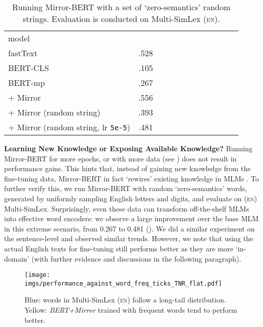 \documentclass[11pt]{article}
\newcommand{\en}{{\textsc{en}}\xspace}
\begin{document}
\begin{table}[]
\centering
\setlength{\tabcolsep}{2.0pt}
\small
\begin{tabular}{lccccccccccc}
\cmidrule[1.0pt]{1-10}
model &   \\
\cmidrule[1.0pt]{1-10}
fastText & .528 \\
\cmidrule[1.0pt]{1-10}
BERT-CLS & .105 \\
BERT-mp & .267 \\
\hdashline
+ Mirror & .556 \\
\hdashline
+ Mirror (random string) & .393 \\
+ Mirror (random string, lr \texttt{5e-5}) & .481 \\
\cmidrule[1.0pt]{1-10}
\end{tabular}
 \vspace{-1.5mm}
\caption{Running Mirror-BERT with a set of `zero-semantics' random strings. Evaluation is conducted on Multi-SimLex (\en).}
\label{tab:random_string_full}
\end{table}



\vspace{1.5mm}
\noindent \textbf{Learning New Knowledge or Exposing Available Knowledge?} Running Mirror-BERT for more epochs, or with more data (see ) does not result in performance gains. This hints that, instead of gaining new knowledge from the fine-tuning data, Mirror-BERT in fact `rewires' existing knowledge in MLMs \cite{Zaken:2020bitfit}. To further verify this, we run Mirror-BERT with random `zero-semantics' words, generated by uniformly sampling English letters and digits, and evaluate on (\en) Multi-SimLex. Surprisingly, even these data can transform off-the-shelf MLMs into effective word encoders: we observe a large improvement over the base MLM in this extreme scenario, from 0.267 to 0.481 (). We did a similar experiment on the sentence-level and observed similar trends. However, we note that using the actual English texts for fine-tuning still performs better as they are more `in-domain' (with further evidence and discussions in the following paragraph). 


\begin{figure}[t!]
    \centering
    \texttt{[image: imgs/performance\_against\_word\_freq\_ticks\_TNR\_flat.pdf]}
    \vspace{-3.0mm}
    \caption{{\color{plot_greyblue}Blue}: words in Multi-SimLex (\en) follow a long-tail distribution. {\color{plot_yellow}Yellow}: \textit{BERT+Mirror} trained with frequent words tend to perform better.}
    \label{fig:word_freq}
\end{figure}
\end{document}
